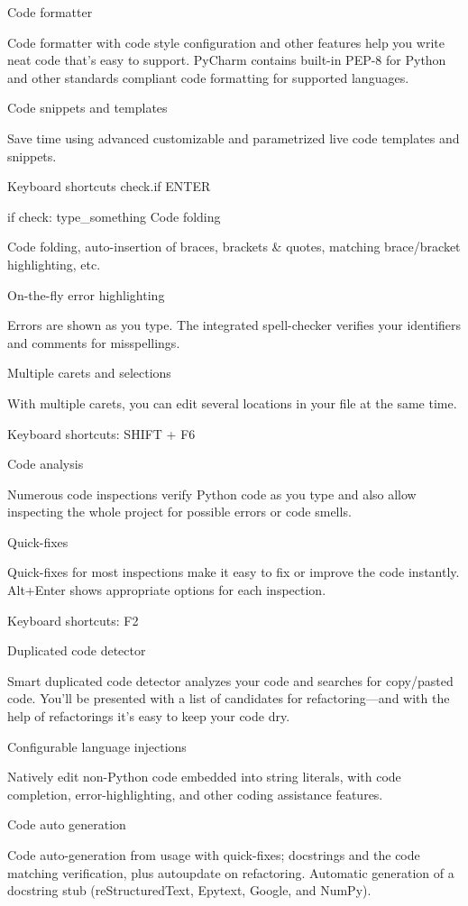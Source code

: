 Code formatter

Code formatter with code style configuration and other features help you write neat code that's easy to support. PyCharm contains built-in PEP-8 for Python and other standards compliant code formatting for supported languages.

Code snippets and templates

Save time using advanced customizable and parametrized live code templates and snippets.



Keyboard shortcuts check.if ENTER

if check:
  type_something
Code folding

Code folding, auto-insertion of braces, brackets & quotes, matching brace/bracket highlighting, etc.

On-the-fly error highlighting

Errors are shown as you type. The integrated spell-checker verifies your identifiers and comments for misspellings.

Multiple carets and selections

With multiple carets, you can edit several locations in your file at the same time.

Keyboard shortcuts: SHIFT + F6

Code analysis

Numerous code inspections verify Python code as you type and also allow inspecting the whole project for possible errors or code smells.

Quick-fixes

Quick-fixes for most inspections make it easy to fix or improve the code instantly. Alt+Enter shows appropriate options for each inspection.

Keyboard shortcuts: F2

Duplicated code detector

Smart duplicated code detector analyzes your code and searches for copy/pasted code. You'll be presented with a list of candidates for refactoring—and with the help of refactorings it's easy to keep your code dry.

Configurable language injections

Natively edit non-Python code embedded into string literals, with code completion, error-highlighting, and other coding assistance features.

Code auto generation

Code auto-generation from usage with quick-fixes; docstrings and the code matching verification, plus autoupdate on refactoring. Automatic generation of a docstring stub (reStructuredText, Epytext, Google, and NumPy).

